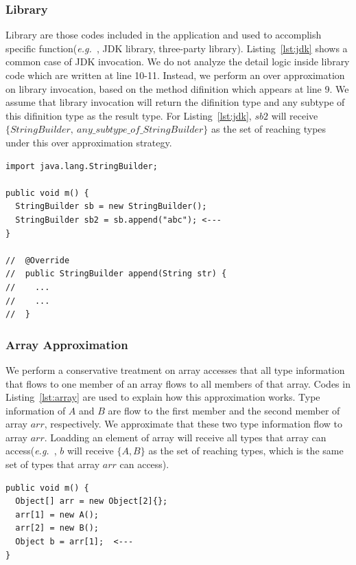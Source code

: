 \documentclass{fac}
\newcommand\eg{\textit{e.g.\ }}
\begin{document}
\subsubsection{Library}\label{subsubsec:library}
Library are those codes included in the application and used to accomplish specific function(\eg, JDK library, three-party library). Listing~\ref{lst:jdk} shows a common case of JDK invocation. We do not analyze the detail logic inside library code which are written at line 10-11. Instead, we perform an over approximation on library invocation, based on the method difinition which appears at line 9. We assume that library invocation will return the difinition type and any subtype of this difinition type as the result type. For Listing~\ref{lst:jdk}, $sb2$ will receive $\{StringBuilder,\ any\_subtype\_of\_StringBuilder\}$ as the set of reaching types under this over approximation strategy.

\begin{lstlisting}[caption={Example of JDK library call},label={lst:jdk}]
import java.lang.StringBuilder;

public void m() {
  StringBuilder sb = new StringBuilder();
  StringBuilder sb2 = sb.append("abc"); <---
}

//  @Override
//  public StringBuilder append(String str) {
//    ...
//    ...
//  }
\end{lstlisting}

\subsubsection{Array Approximation}\label{subsubsec:array-approximation}
We perform a conservative treatment on array accesses that all type information that flows to one member of an array flows to all members of that array. Codes in Listing~\ref{lst:array} are used to explain how this approximation works. Type information of $A$ and $B$ are flow to the first member and the second member of array $arr$, respectively. We approximate that these two type information flow to array $arr$. Loadding an element of array will receive all types that array can access(\eg, $b$ will receive $\{A, B\}$ as the set of reaching types, which is the same set of types that array $arr$ can access).

\begin{lstlisting}[caption={Example of array access},label={lst:array}]
public void m() {
  Object[] arr = new Object[2]{};
  arr[1] = new A();
  arr[2] = new B();
  Object b = arr[1];  <---
}
\end{lstlisting}
\end{document}
